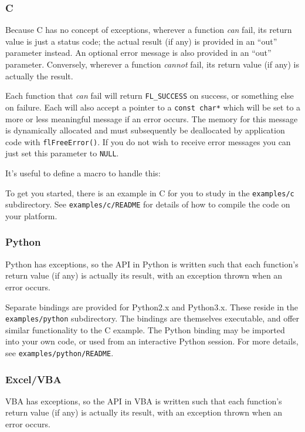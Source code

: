 \subsubsection{C}
Because C has no concept of exceptions, wherever a function \textit{can} fail, its return value is just a status code; the actual result (if any) is provided in an ``out'' parameter instead. An optional error message is also provided in an ``out'' parameter. Conversely, wherever a function \textit{cannot} fail, its return value (if any) is actually the result.

Each function that \textit{can} fail will return \texttt{FL\_SUCCESS} on success, or something else on failure. Each will also accept a pointer to a \texttt{const char*} which will be set to a more or less meaningful message if an error occurs. The memory for this message is dynamically allocated and must subsequently be deallocated by application code with \texttt{flFreeError()}. If you do not wish to receive error messages you can just set this parameter to \texttt{NULL}.

It's useful to define a macro to handle this:


To get you started, there is an example in C for you to study in the \texttt{examples/c} subdirectory. See \texttt{examples/c/README} for details of how to compile the code on your platform.

\subsubsection{Python}
Python has exceptions, so the API in Python is written such that each function's return value (if any) is actually its result, with an exception thrown when an error occurs.

Separate bindings are provided for Python2.x and Python3.x. These reside in the \texttt{examples/python} subdirectory. The bindings are themselves executable, and offer similar functionality to the C example. The Python binding may be imported into your own code, or used from an interactive Python session. For more details, see \texttt{examples/python/README}.

\subsubsection{Excel/VBA}
VBA has exceptions, so the API in VBA is written such that each function's return value (if any) is actually its result, with an exception thrown when an error occurs.

